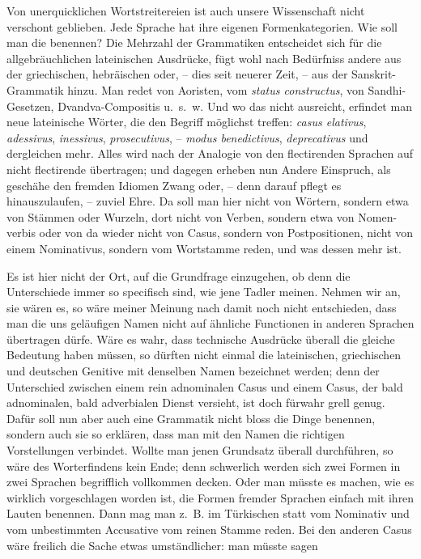 \begin{sloppypar}Von unerquicklichen Wortstreitereien ist auch unsere Wissenschaft nicht verschont geblieben. Jede Sprache hat ihre eigenen Formenkategorien. Wie soll man die benennen? Die Mehrzahl der Grammatiken entscheidet sich für die allgebräuchlichen lateinischen Ausdrücke, fügt wohl nach Bedürfniss andere aus der griechischen, hebräischen oder, – dies seit neuerer Zeit, – aus der Sanskrit-Gram\-matik hinzu. Man redet von Aoristen, vom \textit{status constructus}, von Sandhi-Gesetzen, Dvandva-Compositis u.~s.~w. Und wo das nicht ausreicht, erfindet man neue lateinische Wörter, die den Begriff möglichst treffen: \textit{casus elativus},  \textit{adessivus}, \textit{inessivus}, \textit{prosecutivus}, – \textit{modus benedictivus}, \textit{deprecativus} und dergleichen mehr. Alles wird nach der Analogie von den flectirenden Sprachen auf nicht flectirende übertragen; und dagegen erheben nun Andere Einspruch, als geschähe den fremden Idiomen Zwang oder, – denn darauf pflegt es hinauszulaufen, – zuviel Ehre. Da soll man hier nicht von Wörtern, sondern etwa von Stämmen oder Wurzeln, dort nicht von Verben, sondern etwa von \label{sp.115} Nomen-verbis oder von  da wieder nicht von Casus, sondern von Postpositionen, nicht von einem Nominativus, sondern vom Wortstamme reden, und was dessen mehr ist.\end{sloppypar}

\label{fp.121}

Es ist hier nicht der Ort, auf die Grundfrage einzugehen, ob denn die Unterschiede immer so specifisch sind, wie jene Tadler meinen. Nehmen wir an, sie wären es, so wäre meiner Meinung nach damit noch nicht entschieden, dass man die uns geläufigen Namen nicht auf ähnliche Functionen in anderen Sprachen übertragen dürfe. Wäre es wahr, dass technische Ausdrücke überall die gleiche Bedeutung haben müssen, so dürften nicht einmal die lateinischen, griechischen und deutschen Genitive mit denselben Namen bezeichnet werden; denn der Unterschied zwischen einem rein adnominalen Casus und einem Casus, der bald adnominalen, bald adverbialen Dienst versieht, ist doch fürwahr grell genug. Dafür soll nun aber auch eine Grammatik nicht bloss die Dinge benennen, sondern auch sie so erklären, dass man mit den Namen die richtigen Vorstellungen verbindet. Wollte man jenen Grundsatz überall durchführen, so wäre des Worterfindens kein Ende; denn schwerlich werden sich zwei Formen in zwei Sprachen begrifflich vollkommen decken. Oder man müsste es machen, wie es wirklich vorgeschlagen worden ist, die Formen fremder Sprachen einfach mit ihren Lauten benennen. Dann mag man z.~B. im Türkischen statt vom Nominativ und vom unbestimmten Accusative vom reinen Stamme reden. Bei den anderen Casus wäre freilich die Sache etwas umständlicher: man müsste sagen

